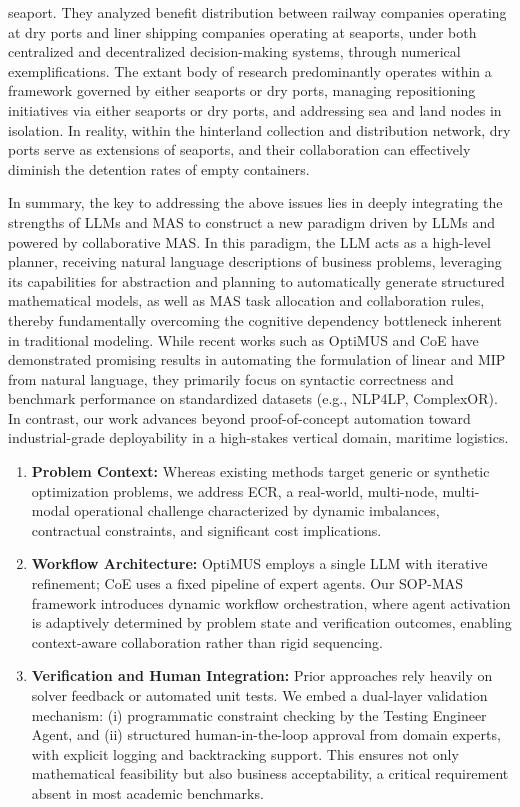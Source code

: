 \documentclass[preprint,12pt]{elsarticle}
\begin{document}
seaport. They analyzed benefit distribution between railway companies operating at dry ports and liner shipping companies operating at seaports, under both centralized and decentralized decision-making systems, through numerical exemplifications. The extant body of research predominantly operates within a framework governed by either seaports or dry ports, managing repositioning initiatives via either seaports or dry ports, and addressing sea and land nodes in isolation. In reality, within the hinterland collection and distribution network, dry ports serve as extensions of seaports, and their collaboration can effectively diminish the detention rates of empty containers.


In summary, the key to addressing the above issues lies in deeply integrating the strengths of LLMs and MAS to construct a new paradigm driven by LLMs and powered by collaborative MAS. In this paradigm, the LLM acts as a high-level planner, receiving natural language descriptions of business problems, leveraging its capabilities for abstraction and planning to automatically generate structured mathematical models, as well as MAS task allocation and collaboration rules, thereby fundamentally overcoming the cognitive dependency bottleneck inherent in traditional modeling. While recent works such as OptiMUS \citep{ahmaditeshniziOptiMUSScalableOptimization2024b} and CoE \citep{xiaoChainofExpertsWhenLLMs2023} have demonstrated promising results in automating the formulation of linear and MIP from natural language, they primarily focus on syntactic correctness and benchmark performance on standardized datasets (e.g., NLP4LP, ComplexOR). In contrast, our work advances beyond proof-of-concept automation toward industrial-grade deployability in a high-stakes vertical domain, maritime logistics.
\begin{enumerate}[label=\arabic*)]

\item \textbf{Problem Context:} Whereas existing methods target generic or synthetic optimization problems, we address ECR, a real-world, multi-node, multi-modal operational challenge characterized by dynamic imbalances, contractual constraints, and significant cost implications.
\item \textbf{Workflow Architecture:} OptiMUS employs a single LLM with iterative refinement; CoE uses a fixed pipeline of expert agents. Our SOP-MAS framework introduces dynamic workflow orchestration, where agent activation is adaptively determined by problem state and verification outcomes, enabling context-aware collaboration rather than rigid sequencing.
\item \textbf{Verification and Human Integration:} Prior approaches rely heavily on solver feedback or automated unit tests. We embed a dual-layer validation mechanism: (i) programmatic constraint checking by the Testing Engineer Agent, and (ii) structured human-in-the-loop approval from domain experts, with explicit logging and backtracking support. This ensures not only mathematical feasibility but also business acceptability, a critical requirement absent in most academic benchmarks.
\end{enumerate}
\end{document}

